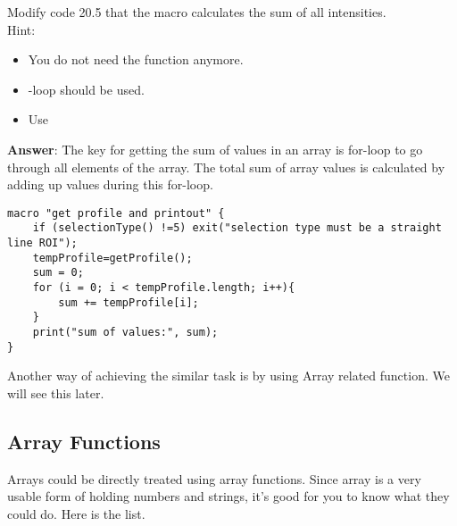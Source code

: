 \begin{leftbar}
Modify code 20.5 that the macro calculates the sum of all intensities.\\

Hint:
\begin{itemize}
\item You do not need the function anymore. 
\item {}-loop should be used.
\item Use 
\end{itemize}
\end{leftbar}

\item \textbf{Answer}: The key for getting the sum of values in an array is for-loop to go through all elements of the array. The total sum of array values is calculated by adding up values during this for-loop.   
\begin{lstlisting}[numbers=none]
macro "get profile and printout" {
	if (selectionType() !=5) exit("selection type must be a straight line ROI");
	tempProfile=getProfile();
	sum = 0;
	for (i = 0; i < tempProfile.length; i++){
		sum += tempProfile[i];
	}
	print("sum of values:", sum);
}  
\end{lstlisting}

Another way of achieving the similar task is by using Array related function. We will see this later. 

\subsection{Array Functions}

Arrays could be directly treated using array functions. Since array is a very usable form of holding numbers and strings, it's good for you to know what they could do. Here is the list.

